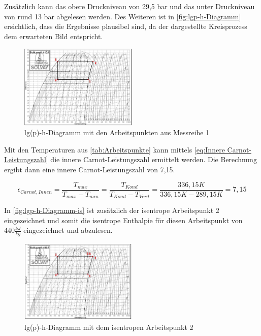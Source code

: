     Zusätzlich kann das obere Druckniveau von 29,5 bar und das unter Druckniveau von rund 13 bar abgelesen werden.
    Des Weiteren ist in \autoref{fig:lgp-h-Diagramm} ersichtlich, dass die Ergebnisse plausibel sind, da der dargestellte Kreisprozess dem erwarteten Bild entspricht.\\

    \begin{figure}[!h]
        \centering
        \includegraphics[width=0.5\textwidth]{Abbildungen/lgp-h-diagramm.jpg}
        \caption{lg(p)-h-Diagramm mit den Arbeitspunkten aus Messreihe 1}
        \label{fig:lgp-h-Diagramm}
    \end{figure}

Mit den Temperaturen aus \autoref{tab:Arbeitspunkte} kann mittels \autoref{eq:Innere Carnot-Leistungszahl} die innere Carnot-Leistungszahl
ermittelt werden. Die Berechnung ergibt dann eine innere Carnot-Leistungszahl von 7,15.

    \begin{equation}
        \epsilon_{Carnot, Innen}=\frac{T_{max}}{T_{max}-T_{min}}=\frac{T_{Kond}}{T_{Kond}-T_{Verd}}=\frac{336,15 K}{336,15 K-289,15 K}=7,15
        \label{eq:Innere Carnot-Leistungszahl}
    \end{equation}

 In \autoref{fig:lgp-h-Diagramm-is} ist zusätzlich der isentrope Arbeitspunkt 2 eingezeichnet und somit die isentrope Enthalpie für diesen Arbeitspunkt von $440 \frac{kJ}{kg}$
 eingezeichnet und abzulesen.
    
 \begin{figure}[!h]
        \centering
        \includegraphics[width=0.5\textwidth]{Abbildungen/lgp-h-diagramm-is.jpg}
        \caption{lg(p)-h-Diagramm mit dem isentropen Arbeitspunkt 2}
        \label{fig:lgp-h-Diagramm-is}
    \end{figure}

